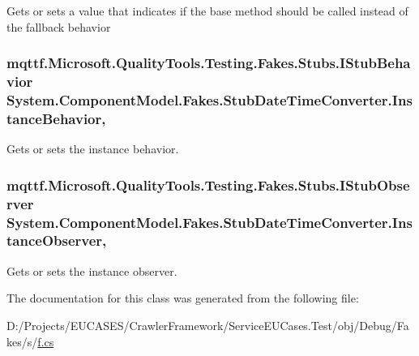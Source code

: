 Gets or sets a value that indicates if the base method should be called instead of the fallback behavior

\hypertarget{class_system_1_1_component_model_1_1_fakes_1_1_stub_date_time_converter_ae2a4d664b00b0974d7042261c70dc5bd}{
\subsubsection[{Instance\-Behavior}]{\setlength{\rightskip}{0pt plus 5cm}mqttf.\-Microsoft.\-Quality\-Tools.\-Testing.\-Fakes.\-Stubs.\-I\-Stub\-Behavior System.\-Component\-Model.\-Fakes.\-Stub\-Date\-Time\-Converter.\-Instance\-Behavior\hspace{0.3cm}{\ttfamily [get]}, {\ttfamily [set]}}}\label{class_system_1_1_component_model_1_1_fakes_1_1_stub_date_time_converter_ae2a4d664b00b0974d7042261c70dc5bd}


Gets or sets the instance behavior.

\hypertarget{class_system_1_1_component_model_1_1_fakes_1_1_stub_date_time_converter_af1d70143dfb62649192a3e85f0a38b4a}{
\subsubsection[{Instance\-Observer}]{\setlength{\rightskip}{0pt plus 5cm}mqttf.\-Microsoft.\-Quality\-Tools.\-Testing.\-Fakes.\-Stubs.\-I\-Stub\-Observer System.\-Component\-Model.\-Fakes.\-Stub\-Date\-Time\-Converter.\-Instance\-Observer\hspace{0.3cm}{\ttfamily [get]}, {\ttfamily [set]}}}\label{class_system_1_1_component_model_1_1_fakes_1_1_stub_date_time_converter_af1d70143dfb62649192a3e85f0a38b4a}


Gets or sets the instance observer.



The documentation for this class was generated from the following file\-:\begin{DoxyCompactItemize}
\item 
D\-:/\-Projects/\-E\-U\-C\-A\-S\-E\-S/\-Crawler\-Framework/\-Service\-E\-U\-Cases.\-Test/obj/\-Debug/\-Fakes/s/\hyperlink{s_2f_8cs}{f.\-cs}\end{DoxyCompactItemize}
